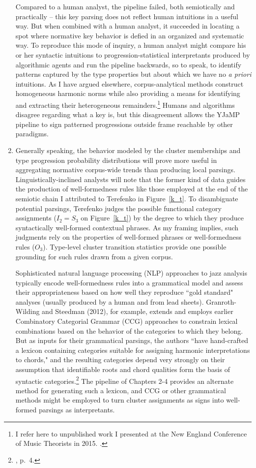 \begin{enumerate}
Compared to a human analyst, the pipeline failed, both semiotically and practically -- this key parsing does not reflect human intuitions in a useful way.  But when combined with a human analyst, it succeeded in locating a spot where normative key behavior is defied in an organized and systematic way.  To reproduce this mode of inquiry, a human analyst might compare his or her syntactic intuitions to progression-statistical interpretants produced by algorithmic agents and run the pipeline backwards, so to speak, to identify patterns captured by the type properties but about which we have no \emph{a priori} intuitions.  As I have argued elsewhere, corpus-analytical methods construct homogeneous harmonic norms while also providing a means for identifying and extracting their heterogeneous remainders.\footnote{I refer here to unpublished work I presented at the New England Conference of Music Theorists in 2015.  \cite{jones2015}.}  Humans and algorithms disagree regarding what a key is, but this disagreement allows the YJaMP pipeline to sign patterned progressions outside frame reachable by other paradigms.

	\item Generally speaking, the behavior modeled by the cluster memberships and type progression probability distributions will prove more useful in aggregating normative corpus-wide trends than producing local parsings.  Linguistically-inclined analysts will note that the former kind of data guides the production of well-formedness rules like those employed at the end of the semiotic chain I attributed to Terefenko in Figure~\ref{k_t}.  To disambiguate potential parsings, Terefenko judges the possible functional category assignments ($I_2 = S_3$ on Figure~\ref{k_t}) by the degree to which they produce syntactically well-formed contextual phrases.  As my framing implies, such judgments rely on the properties of well-formed phrases or well-formedness rules ($O_3$).  Type-level cluster transition statistics provide one possible grounding for such rules drawn from a given corpus.
	
Sophisticated natural language processing (NLP) approaches to jazz analysis typically encode well-formedness rules into a grammatical model and assess their appropriateness based on how well they reproduce ``gold standard" analyses (usually produced by a human and from lead sheets).  Granroth-Wilding and Steedman (2012), for example, extends and employs earlier Combinatory Categorial Grammar (CCG) approaches to constrain lexical combinations based on the behavior of the categories to which they belong.  But as inputs for their grammatical parsings, the authors ``have hand-crafted a lexicon containing categories suitable for assigning harmonic interpretations to chords," and the resulting categories depend very strongly on their assumption that identifiable roots and chord qualities form the basis of syntactic categories.\footnote{\cite{granroth2012}, p.\ 4.}  The pipeline of Chapters 2-4 provides an alternate method for generating such a lexicon, and CCG or other grammatical methods might be employed to turn cluster assignments as signs into well-formed parsings as interpretants.


\end{enumerate}
